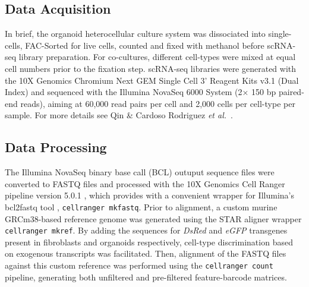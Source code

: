 



\subsection{Data Acquisition}

In brief, the organoid heterocellular culture system was dissociated into single-cells, FAC-Sorted for live cells, counted and fixed with methanol before scRNA-seq library preparation. For co-cultures, different cell-types were mixed at equal cell numbers prior to the fixation step. scRNA-seq libraries were generated with the 10X Genomics Chromium Next GEM Single Cell 3' Reagent Kits v3.1 (Dual Index) and sequenced with the Illumina NovaSeq 6000 System (2$\times$ 150 bp paired-end reads), aiming at 60,000 read pairs per cell and 2,000 cells per cell-type per sample. For more details see Qin \& Cardoso Rodriguez \emph{et al.}~\cite{cardoso_rodriguez_single-cell_2023}.

\subsection{Data Processing}

The Illumina NovaSeq binary base call (BCL) outuput sequence files were converted to FASTQ files and processed with the 10X Genomics Cell Ranger pipeline version 5.0.1 \cite{10x_genomics_what_nodate}, which provides with a convenient wrapper for Illumina's bcl2fastq tool \cite{illumina_bcl2fastq_nodate}, \texttt{cellranger mkfastq}. Prior to alignment, a custom murine GRCm38-based reference genome was generated using the STAR aligner \cite{dobin_star_2013} wrapper \texttt{cellranger mkref}. By adding the sequences for \textit{DsRed} and \textit{eGFP} transgenes present in fibroblasts and organoids respectively, cell-type discrimination based on exogenous transcripts was facilitated. Then, alignment of the FASTQ files against this custom reference was performed using the \texttt{cellranger count} pipeline, generating both unfiltered and pre-filtered feature-barcode matrices.

